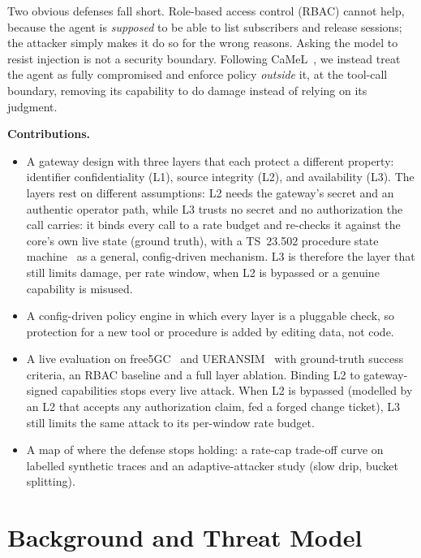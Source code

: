 \documentclass[conference]{IEEEtran}
\begin{document}
Two obvious defenses fall short. Role-based access control (RBAC) cannot help, because the
agent is \emph{supposed} to be able to list subscribers and release sessions; the attacker
simply makes it do so for the wrong reasons. Asking the model to resist injection is not a
security boundary. Following CaMeL~\cite{camel2025}, we instead treat the agent as fully
compromised and enforce policy \emph{outside} it, at the tool-call boundary, removing its
capability to do damage instead of relying on its judgment.

\textbf{Contributions.}
\begin{itemize}
  \item A gateway design with three layers that each protect a different property:
        identifier confidentiality (L1), source integrity (L2), and availability (L3). The layers
        rest on different assumptions: L2 needs the gateway's secret and an authentic operator
        path, while L3 trusts no secret and no authorization the call carries: it binds every call
        to a rate budget and re-checks it against the core's own live state (ground truth), with a
        TS~23.502 procedure state machine~\cite{ts23502} as a general, config-driven mechanism. L3
        is therefore the layer that still limits damage, per rate window, when L2 is bypassed or a
        genuine capability is misused.
  \item A config-driven policy engine in which every layer is a pluggable check, so
        protection for a new tool or procedure is added by editing data, not code.
  \item A live evaluation on free5GC~\cite{free5gc} and UERANSIM~\cite{ueransim} with
        ground-truth success criteria, an RBAC baseline and a full layer ablation. Binding L2 to
        gateway-signed capabilities stops every live attack. When L2 is bypassed (modelled
        by an L2 that accepts any authorization claim, fed a forged change ticket),
        L3 still limits the same attack to its per-window rate budget.
  \item A map of where the defense stops holding: a rate-cap trade-off curve on
        labelled synthetic traces and an adaptive-attacker study (slow drip, bucket
        splitting).
\end{itemize}

\section{Background and Threat Model}
\end{document}
